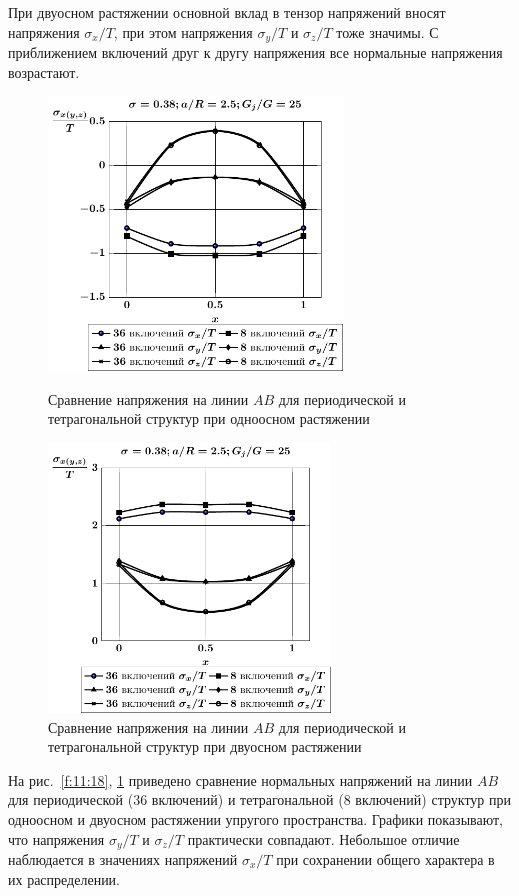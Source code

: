 При двуосном растяжении основной вклад в тензор напряжений вносят напряжения $\sigma_x/T$, при этом напряжения $\sigma_y/T$ и $\sigma_z/T$ тоже значимы. С приближением включений друг к другу напряжения все нормальные напряжения возрастают.

\begin{figure}[h!]
\centering\footnotesize
\parbox[b]{7.5cm}{\centering\includegraphics[width=7.8cm]{spheres-inc27-8-a25-g25-t1.pdf}
\caption{Сравнение напряжения на линии $AB$ для периодической и тетрагональной структур при одноосном растяжении
\label{f:11:18}}}\hfil\hfil
\parbox[b]{7.5cm}{\centering\includegraphics[width=7.5cm]{spheres-inc27-8-a25-g25-t2.pdf}
\caption{Сравнение напряжения на линии $AB$ для периодической и тетрагональной структур при двуосном растяжении
\label{f:11:19}}}
\end{figure}

На рис.~\ref{f:11:18}, \ref{f:11:19} приведено сравнение нормальных напряжений на линии $AB$ для периодической (36 включений) и тетрагональной (8 включений) структур при одноосном и двуосном растяжении упругого пространства. Графики показывают, что напряжения $\sigma_y/T$ и $\sigma_z/T$ практически совпадают. Небольшое отличие наблюдается в значениях напряжений $\sigma_x/T$ при сохранении общего характера в их распределении.


